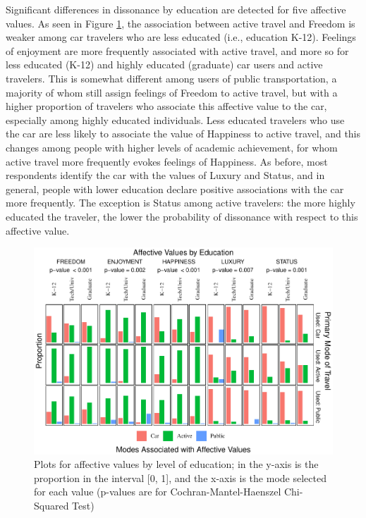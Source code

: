 \documentclass[]{elsarticle} %
\begin{document}
Significant differences in dissonance by education are detected for five
affective values. As seen in Figure \ref{fig:bar-plots-by-education},
the association between active travel and Freedom is weaker among car
travelers who are less educated (i.e., education K-12). Feelings of
enjoyment are more frequently associated with active travel, and more so
for less educated (K-12) and highly educated (graduate) car users and
active travelers. This is somewhat different among users of public
transportation, a majority of whom still assign feelings of Freedom to
active travel, but with a higher proportion of travelers who associate
this affective value to the car, especially among highly educated
individuals. Less educated travelers who use the car are less likely to
associate the value of Happiness to active travel, and this changes
among people with higher levels of academic achievement, for whom active
travel more frequently evokes feelings of Happiness. As before, most
respondents identify the car with the values of Luxury and Status, and
in general, people with lower education declare positive associations
with the car more frequently. The exception is Status among active
travelers: the more highly educated the traveler, the lower the
probability of dissonance with respect to this affective value.

\begin{figure}
\centering
\includegraphics{Dissonance_Santiago_v3_files/figure-latex/figure-bar-plots-by-attribute-and-education-1.pdf}
\caption{\label{fig:bar-plots-by-education}Plots for affective values by
level of education; in the y-axis is the proportion in the interval
{[}0, 1{]}, and the x-axis is the mode selected for each value (p-values
are for Cochran-Mantel-Haenszel Chi-Squared Test)}
\end{figure}
\end{document}
